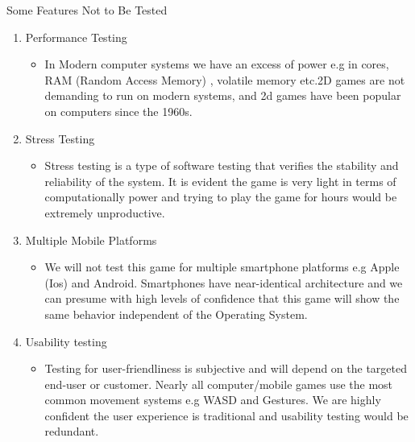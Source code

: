 



\centerline{Some Features Not to Be Tested
}

\begin{enumerate}
   \item Performance Testing 
   \begin{itemize}
     \item  In Modern computer systems we have an excess of power e.g in cores, RAM (Random Access Memory) , volatile memory etc.2D games are not demanding to run on modern systems, and 2d games have been popular on computers since the 1960s.
   \end{itemize}
  
  \item Stress Testing
   \begin{itemize}
     \item Stress testing is a type of software testing that verifies the stability and reliability of the system. It is evident the game is very light in terms of computationally power and trying to play the game for hours would be extremely unproductive.

   \end{itemize}

     \item Multiple Mobile Platforms
   \begin{itemize}
     \item We will not test this game for multiple smartphone platforms e.g Apple (Ios) and Android. Smartphones have near-identical architecture and we can presume with high levels of confidence that this game will show the same behavior independent of the Operating System.
   \end{itemize}



 \item Usability testing
   \begin{itemize}
 	\item 
 	 Testing for user-friendliness is subjective and will depend on the targeted end-user or customer. Nearly all computer/mobile games use the most common movement systems e.g WASD and Gestures. We are highly confident the user experience is traditional and usability testing would be redundant.
 	 \end{itemize}
 	 \end{enumerate}
